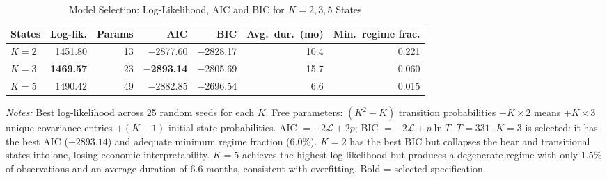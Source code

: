 \documentclass[11pt, a4paper]{article}
\begin{document}
\begin{table}[htbp]
\centering
\caption{Model Selection: Log-Likelihood, AIC and BIC for $K = 2, 3, 5$ States}
\label{tab:model_selection}
\setlength{\tabcolsep}{8pt}
\small
\begin{tabular}{lrrrrrr}
\toprule
\textbf{States} & \textbf{Log-lik.} & \textbf{Params} & \textbf{AIC} & \textbf{BIC}
  & \textbf{Avg.\ dur.\ (mo)} & \textbf{Min.\ regime frac.} \\
\midrule
$K = 2$ & 1451.80 & 13 & $-$2877.60 & $-$2828.17 & 10.4 & 0.221 \\
$K = 3$ & \textbf{1469.57} & 23 & $\mathbf{-}$\textbf{2893.14} & $-$2805.69 & 15.7 & 0.060 \\
$K = 5$ & 1490.42 & 49 & $-$2882.85 & $-$2696.54 & 6.6 & 0.015 \\
\bottomrule
\end{tabular}
\begin{minipage}{\linewidth}
\vspace{4pt}\footnotesize
\textit{Notes:} Best log-likelihood across 25 random seeds for each $K$. Free parameters:
$(K^2-K)$ transition probabilities $+ K\times 2$ means $+ K\times 3$ unique covariance entries $+ (K-1)$
initial state probabilities. AIC $= -2\mathcal{L} + 2p$; BIC $= -2\mathcal{L} + p\ln T$, $T=331$.
$K=3$ is selected: it has the best AIC ($-2893.14$) and adequate minimum regime fraction (6.0\%). $K=2$ has the best BIC but collapses the bear and transitional states into one, losing economic interpretability. $K=5$ achieves the highest log-likelihood but produces a degenerate regime with only 1.5\% of observations and an average duration of 6.6 months, consistent with overfitting. Bold = selected specification.
\end{minipage}
\end{table}
\end{document}
